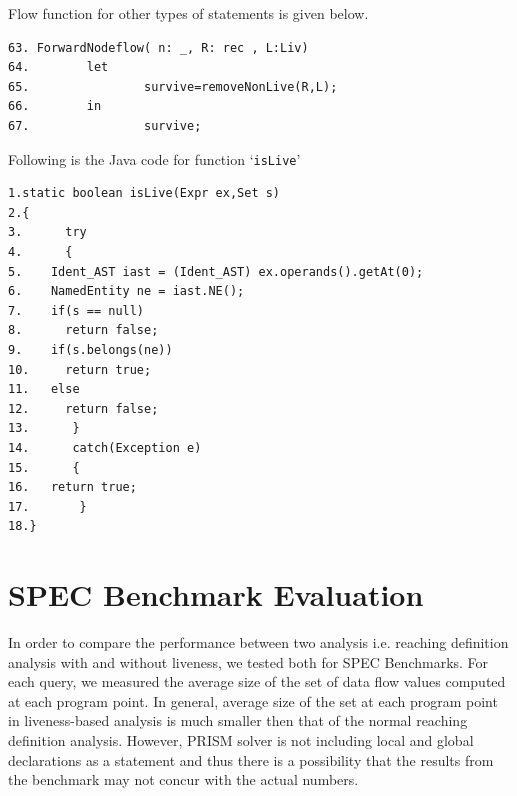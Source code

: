 \documentclass[11pt,a4paper,openright]{report}
\begin{document}
Flow function for other types of statements is given below.

\begin{lstlisting}
63. ForwardNodeflow( n: _, R: rec , L:Liv)
64.        let
65.                survive=removeNonLive(R,L);
66.        in
67.                survive;

\end{lstlisting}

Following is the Java code for function `\texttt{isLive}' 
\begin{lstlisting}
1.static boolean isLive(Expr ex,Set s)
2.{
3.      try
4.      {
5.	  Ident_AST iast = (Ident_AST) ex.operands().getAt(0);
6.	  NamedEntity ne = iast.NE();
7.	  if(s == null)
8.		return false;
9.	  if(s.belongs(ne))
10.		return true;
11.	  else
12.		return false;
13.      }
14.      catch(Exception e)
15.      {
16.	  return true;
17.       }
18.}
\end{lstlisting}


\section{SPEC Benchmark Evaluation}
In order to compare the performance between two analysis i.e. reaching definition analysis with and without liveness, we tested both for SPEC Benchmarks.
For each query, we measured the average size of the set of data flow values computed at each program point. In general, average size of the set at each
program point in liveness-based analysis is much smaller then that of the normal reaching definition analysis. However, PRISM solver is not including local
and global declarations as a statement and thus there is a possibility that the results from the benchmark may not concur with the actual numbers.
\end{document}
